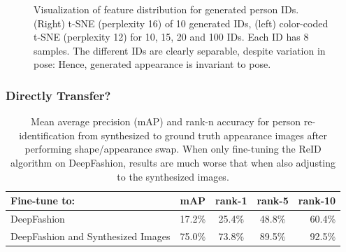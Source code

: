 \begin{frame}[t]
\begin{figure}[htp]
				\caption{Visualization of feature distribution for generated person IDs. (Right) t-SNE (perplexity 16) of 10 generated IDs, (left) color-coded t-SNE (perplexity 12) for 10, 15, 20 and 100 IDs. Each ID has 8 samples. The different IDs are clearly separable, despite variation in pose: Hence, generated appearance is invariant to pose.}
				\label{fig:tsne}
			\end{figure}
		\end{frame}

		\begin{frame}[t]
		\frametitle{Directly Transfer?}
			\begin{table}[htp]
				\centering
				\caption{Mean average precision (mAP) and rank-n accuracy for person re-identification from synthesized to ground truth appearance images after performing shape/appearance swap. When only fine-tuning the ReID algorithm on DeepFashion, results are much worse that when also adjusting to the synthesized images.}
				\label{tab:reiddirect}
				\begin{tabular}{l|cccr}
					\hline
					Fine-tune to: & mAP & rank-1 & rank-5 & rank-10 \\ \hline
					DeepFashion & {17.2}\% & {25.4}\% &{48.8}\% & {60.4}\% \\
					DeepFashion and Synthesized Images& {75.0}\% & {73.8}\% &{89.5}\% & {92.5}\% \\ \hline
				\end{tabular}
			\end{table}
		\end{frame}

